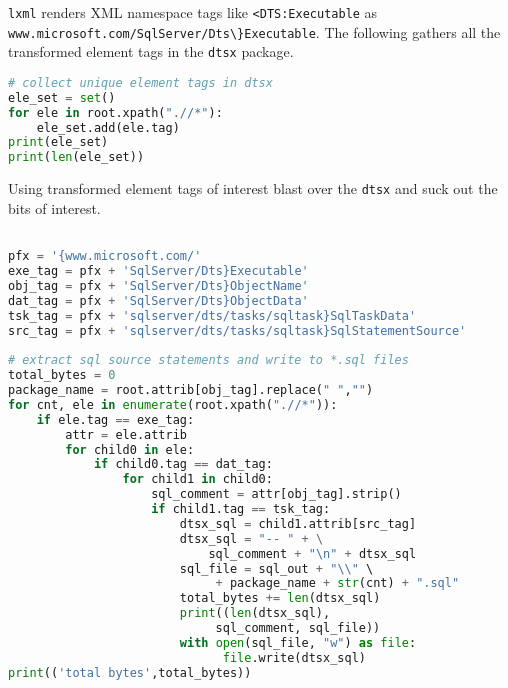\texttt{lxml} renders XML namespace tags like
\verb|<DTS:Executable| as
\verb|www.microsoft.com/SqlServer/Dts\}Executable|. The following
gathers all the transformed element tags in the \texttt{dtsx} package.

\begin{tcolorbox}[breakable, size=fbox, boxrule=1pt, pad at break*=1mm,colback=cellbackground, colframe=cellborder]
\begin{lstlisting}[language=python, frame=single, framerule=0pt, label=lst:scr5673X4]
# collect unique element tags in dtsx
ele_set = set()
for ele in root.xpath(".//*"):
    ele_set.add(ele.tag)    
print(ele_set)
print(len(ele_set))
\end{lstlisting}
\end{tcolorbox}

Using transformed element tags of interest blast over the \texttt{dtsx}
and suck out the bits of interest.

\begin{tcolorbox}[breakable, size=fbox, boxrule=1pt, pad at break*=1mm,colback=cellbackground, colframe=cellborder]
\begin{lstlisting}[language=python, frame=single, framerule=0pt, label=lst:scr5673X5] %, basicstyle=\ttfamily\scriptsize]

pfx = '{www.microsoft.com/'
exe_tag = pfx + 'SqlServer/Dts}Executable'
obj_tag = pfx + 'SqlServer/Dts}ObjectName'
dat_tag = pfx + 'SqlServer/Dts}ObjectData'
tsk_tag = pfx + 'sqlserver/dts/tasks/sqltask}SqlTaskData'
src_tag = pfx + 'sqlserver/dts/tasks/sqltask}SqlStatementSource'
  
# extract sql source statements and write to *.sql files 
total_bytes = 0
package_name = root.attrib[obj_tag].replace(" ","")
for cnt, ele in enumerate(root.xpath(".//*")):
    if ele.tag == exe_tag:
        attr = ele.attrib
        for child0 in ele:
            if child0.tag == dat_tag:
                for child1 in child0:
                    sql_comment = attr[obj_tag].strip()
                    if child1.tag == tsk_tag:
                        dtsx_sql = child1.attrib[src_tag]
                        dtsx_sql = "-- " + \
                            sql_comment + "\n" + dtsx_sql
                        sql_file = sql_out + "\\" \
                             + package_name + str(cnt) + ".sql"
                        total_bytes += len(dtsx_sql)
                        print((len(dtsx_sql), 
                             sql_comment, sql_file))
                        with open(sql_file, "w") as file:
                              file.write(dtsx_sql)
print(('total bytes',total_bytes))
\end{lstlisting}
\end{tcolorbox}


